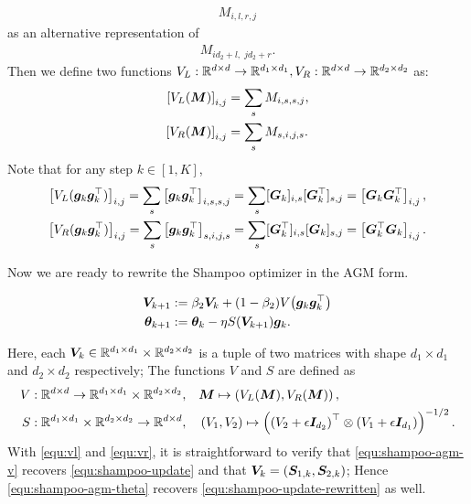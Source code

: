 \begin{align*}M_{i,l,r,j}\end{align*}
as an alternative representation of
\begin{align*}M_{i d_2 + l,\; j d_2 + r}.\end{align*}
Then we define two functions $V_L: \mathbb{R}^{d\times d} \rightarrow \mathbb{R}^{d_1 \times d_1}, V_R: \mathbb{R}^{d \times d} \rightarrow \mathbb{R}^{d_2 \times d_2}$ as: 
\begin{align*}
    \left[V_L({\bm{M}})\right]_{i,j} &= \sum_s M_{i,s,s,j}, \\
    \left[V_R({\bm{M}})\right]_{i,j} &= \sum_s M_{s,i,j,s}.
\end{align*}
Note that for any step $k \in [1, K]$,\begin{align}
    \left[V_L({\bm{g}}_k {\bm{g}}_k^\top)\right]_{i,j} = \sum_s \left[{\bm{g}}_k {\bm{g}}_k^\top\right]_{i,s,s,j} = \sum_s [{\bm{G}}_k]_{i, s} [{\bm{G}}_k^\top]_{s, j} = \left[{\bm{G}}_k{\bm{G}}_k^\top\right]_{i,j}, \label{equ:vl}\\
    \left[V_R({\bm{g}}_k {\bm{g}}_k^\top)\right]_{i,j} = \sum_s \left[{\bm{g}}_k {\bm{g}}_k^\top\right]_{s,i,j,s} = \sum_s [{\bm{G}}_k^\top]_{i, s} [{\bm{G}}_k]_{s, j} = \left[{\bm{G}}_k^\top{\bm{G}}_k\right]_{i,j}.\label{equ:vr}
\end{align}

Now we are ready to rewrite the Shampoo optimizer in the AGM form.
\begin{definition}\label{def:shampoo-agm}
    \begin{align}
        {\bm{V}}_{k+1} &:= \beta_2 {\bm{V}}_{k} + (1-\beta_2) V\!\left({\bm{g}}_{k}{\bm{g}}_{k}^\top\right) \label{equ:shampoo-agm-v}\\
    {\bm{\theta}}_{k+1} &:= {\bm{\theta}}_{k} - \eta S({\bm{V}}_{k+1}) {\bm{g}}_{k}. \label{equ:shampoo-agm-theta}
\end{align}
\end{definition}
Here, each ${\bm{V}}_k \in \mathbb{R}^{d_1 \times d_1} \times \mathbb{R}^{d_2 \times d_2}$ is a tuple of two matrices with shape $d_1 \times d_1$ and $d_2 \times d_2$ respectively; The functions $V$ and $S$ are defined as \begin{align*}
    V: \mathbb{R}^{d \times d} \rightarrow \mathbb{R}^{d_1 \times d_1} \times \mathbb{R}^{d_2 \times d_2}, & \quad {\bm{M}} \mapsto \left(V_L({\bm{M}}), V_R({\bm{M}})\right), \\
    S: \mathbb{R}^{d_1 \times d_1} \times \mathbb{R}^{d_2 \times d_2} \rightarrow \mathbb{R}^{d \times d}, & \quad \left(V_1, V_2\right) \mapsto \left(\left
    (V_2+\epsilon {\bm{I}}_{d_2}\right)^\top \otimes \left(V_1+\epsilon {\bm{I}}_{d_1}\right)\right)^{-1/2}.
\end{align*}
With \eqref{equ:vl} and \eqref{equ:vr}, it is straightforward to verify that \eqref{equ:shampoo-agm-v} recovers \eqref{equ:shampoo-update}
and that ${\bm{V}}_k = ({\bm{S}}_{1,k}, {\bm{S}}_{2,k})$; Hence \eqref{equ:shampoo-agm-theta} recovers \eqref{equ:shampoo-update-rewritten} as well.


